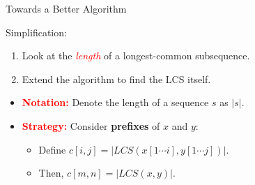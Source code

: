 \documentclass{beamer}
\begin{document}
\begin{frame}{Towards a Better Algorithm}
    \begin{exampleblock}{Simplification:}
        \begin{enumerate}
            \item Look at the \textcolor{red}{\textit{length}} of a longest-common subsequence.
            \item Extend the algorithm to find the LCS itself.
        \end{enumerate}
    \end{exampleblock}
    \begin{itemize} \pause
        \item \textcolor{red}{\textbf{Notation:}} Denote the length of a sequence $s$ as $|s|$. \pause
        \item \textcolor{red}{\textbf{Strategy:}} Consider \textbf{prefixes} of $x$ and $y$:
            \begin{itemize}
                \item Define $c[i, j] = | LCS(x[1 \cdots i], y[1 \cdots j]) |$.
                \item Then, $c[m, n] = | LCS(x, y) |$.
            \end{itemize}
    \end{itemize}
\end{frame}
\end{document}
